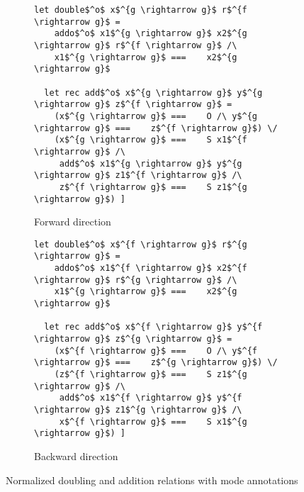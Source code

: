 \begin{figure}[h]
  \centering
  \begin{subfigure}[b]{0.45\textwidth}
    \begin{lstlisting}[frame=tb]
  let double$^o$ x$^{g \rightarrow g}$ r$^{f \rightarrow g}$ = 
    addo$^o$ x1$^{g \rightarrow g}$ x2$^{g \rightarrow g}$ r$^{f \rightarrow g}$ /\ 
    x1$^{g \rightarrow g}$ ===    x2$^{g \rightarrow g}$

  let rec add$^o$ x$^{g \rightarrow g}$ y$^{g \rightarrow g}$ z$^{f \rightarrow g}$ =
    (x$^{g \rightarrow g}$ ===    O /\ y$^{g \rightarrow g}$ ===    z$^{f \rightarrow g}$) \/
    (x$^{g \rightarrow g}$ ===    S x1$^{f \rightarrow g}$ /\
     add$^o$ x1$^{g \rightarrow g}$ y$^{g \rightarrow g}$ z1$^{f \rightarrow g}$ /\
     z$^{f \rightarrow g}$ ===    S z1$^{g \rightarrow g}$) ]
    \end{lstlisting}
   \caption{Forward direction}
    \label{fig:double_fwd}
  \end{subfigure}
  \hfill
  \begin{subfigure}[b]{0.45\textwidth}
    \begin{lstlisting}[frame=tb]
  let double$^o$ x$^{f \rightarrow g}$ r$^{g \rightarrow g}$ = 
    addo$^o$ x1$^{f \rightarrow g}$ x2$^{f \rightarrow g}$ r$^{g \rightarrow g}$ /\ 
    x1$^{g \rightarrow g}$ ===    x2$^{g \rightarrow g}$

  let rec add$^o$ x$^{f \rightarrow g}$ y$^{f \rightarrow g}$ z$^{g \rightarrow g}$ =
    (x$^{f \rightarrow g}$ ===    O /\ y$^{f \rightarrow g}$ ===    z$^{g \rightarrow g}$) \/
    (z$^{f \rightarrow g}$ ===    S z1$^{g \rightarrow g}$ /\
     add$^o$ x1$^{f \rightarrow g}$ y$^{f \rightarrow g}$ z1$^{g \rightarrow g}$ /\
     x$^{f \rightarrow g}$ ===    S x1$^{g \rightarrow g}$) ]
    \end{lstlisting}
    \caption{Backward direction}
    \label{fig:double_bw}
  \end{subfigure}
  \caption{Normalized doubling and addition relations with mode annotations}
  \label{fig:double_modded}
\end{figure}
